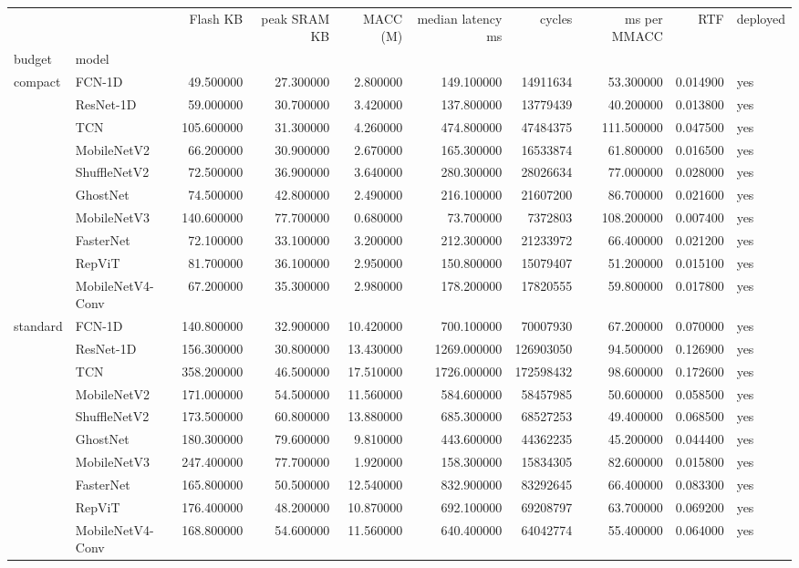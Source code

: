 \begin{tabular}{llrrrrrrrl}
\toprule
 &  & Flash KB & peak SRAM KB & MACC (M) & median latency ms & cycles & ms per MMACC & RTF & deployed \\
budget & model &  &  &  &  &  &  &  &  \\
\midrule
\multirow[t]{10}{*}{compact} & FCN-1D & 49.500000 & 27.300000 & 2.800000 & 149.100000 & 14911634 & 53.300000 & 0.014900 & yes \\
 & ResNet-1D & 59.000000 & 30.700000 & 3.420000 & 137.800000 & 13779439 & 40.200000 & 0.013800 & yes \\
 & TCN & 105.600000 & 31.300000 & 4.260000 & 474.800000 & 47484375 & 111.500000 & 0.047500 & yes \\
 & MobileNetV2 & 66.200000 & 30.900000 & 2.670000 & 165.300000 & 16533874 & 61.800000 & 0.016500 & yes \\
 & ShuffleNetV2 & 72.500000 & 36.900000 & 3.640000 & 280.300000 & 28026634 & 77.000000 & 0.028000 & yes \\
 & GhostNet & 74.500000 & 42.800000 & 2.490000 & 216.100000 & 21607200 & 86.700000 & 0.021600 & yes \\
 & MobileNetV3 & 140.600000 & 77.700000 & 0.680000 & 73.700000 & 7372803 & 108.200000 & 0.007400 & yes \\
 & FasterNet & 72.100000 & 33.100000 & 3.200000 & 212.300000 & 21233972 & 66.400000 & 0.021200 & yes \\
 & RepViT & 81.700000 & 36.100000 & 2.950000 & 150.800000 & 15079407 & 51.200000 & 0.015100 & yes \\
 & MobileNetV4-Conv & 67.200000 & 35.300000 & 2.980000 & 178.200000 & 17820555 & 59.800000 & 0.017800 & yes \\
\cline{1-10}
\multirow[t]{10}{*}{standard} & FCN-1D & 140.800000 & 32.900000 & 10.420000 & 700.100000 & 70007930 & 67.200000 & 0.070000 & yes \\
 & ResNet-1D & 156.300000 & 30.800000 & 13.430000 & 1269.000000 & 126903050 & 94.500000 & 0.126900 & yes \\
 & TCN & 358.200000 & 46.500000 & 17.510000 & 1726.000000 & 172598432 & 98.600000 & 0.172600 & yes \\
 & MobileNetV2 & 171.000000 & 54.500000 & 11.560000 & 584.600000 & 58457985 & 50.600000 & 0.058500 & yes \\
 & ShuffleNetV2 & 173.500000 & 60.800000 & 13.880000 & 685.300000 & 68527253 & 49.400000 & 0.068500 & yes \\
 & GhostNet & 180.300000 & 79.600000 & 9.810000 & 443.600000 & 44362235 & 45.200000 & 0.044400 & yes \\
 & MobileNetV3 & 247.400000 & 77.700000 & 1.920000 & 158.300000 & 15834305 & 82.600000 & 0.015800 & yes \\
 & FasterNet & 165.800000 & 50.500000 & 12.540000 & 832.900000 & 83292645 & 66.400000 & 0.083300 & yes \\
 & RepViT & 176.400000 & 48.200000 & 10.870000 & 692.100000 & 69208797 & 63.700000 & 0.069200 & yes \\
 & MobileNetV4-Conv & 168.800000 & 54.600000 & 11.560000 & 640.400000 & 64042774 & 55.400000 & 0.064000 & yes \\
\cline{1-10}
\bottomrule
\end{tabular}
